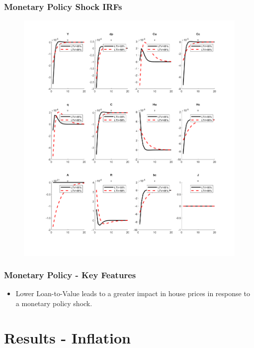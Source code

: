 \documentclass{beamer}
\begin{document}
\begin{frame}
	\frametitle{Monetary Policy Shock IRFs}
	
	\begin{figure}[H]\centering
  \includegraphics[scale=0.3]{_u}
\end{figure}
	
\end{frame}

\begin{frame}
	\frametitle{Monetary Policy - Key Features}
	\begin{itemize}
  \item Lower Loan-to-Value leads to a greater impact in house prices in response to a monetary policy shock.
\end{itemize}
\end{frame}




\section{Results - Inflation}
\end{document}
